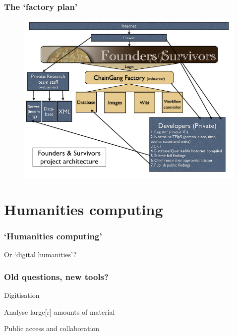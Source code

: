 \documentclass[ignorenonframetext,11pt]{beamer}
\begin{document}
\begin{frame}
\frametitle{The `factory plan'}
\label{thefactoryplan}

\begin{figure}
	\label{factory}
	\begin{center}
	\includegraphics[keepaspectratio,width=\textwidth, height=.75\textheight]{images/factory33.png}
	\end{center}
	\end{figure}
	



\end{frame}
		

\section{Humanities computing}
\label{humanitiescomputing}

\begin{frame}
\frametitle{`Humanities computing'}
\label{humanitiescomputing}

Or `digital humanities'?



\end{frame}
		

\begin{frame}
\frametitle{Old questions, new tools?}
\label{oldquestionsnewtools}

Digitisation


Analyse large[r] amounts of material


Public access and collaboration



\end{frame}
		
\end{document}
